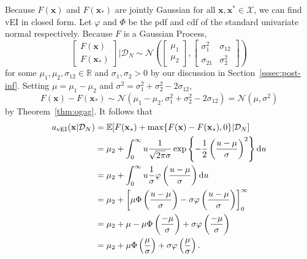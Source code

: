 Because $F(\mathbf{x})$ and $F(\mathbf{x}_*)$ are jointly Gaussian for all $\mathbf{x}, \mathbf{x}^{*} \in \mathcal{X}$, we can find vEI in closed form.
Let $\varphi$ and $\Phi$ be the pdf and cdf of the standard univariate normal respectively.
Because $F$ is a Gaussian Process,
\begin{equation*}
    \begin{bmatrix}
        F(\mathbf{x}) \\
        F(\mathbf{x}_*)
    \end{bmatrix}
    \bigg| \mathcal{D}_N
    \sim \mathcal{N}\left(
    \begin{bmatrix}
            \mu_1 \\
            \mu_2
        \end{bmatrix}
    ,
    \begin{bmatrix}
            \sigma_{1}^2 & \sigma_{12} \\
            \sigma_{21} & \sigma^2_2
        \end{bmatrix}
    \right)
\end{equation*}
for some $\mu_1, \mu_2, \sigma_{12} \in \mathbb{R}$ and $\sigma_1, \sigma_2 > 0$ by our discussion in Section~\ref{sssec:post-inf}.
Setting $\mu = \mu_1 - \mu_2$ and $\sigma^2 = \sigma_1^2 + \sigma_2^2 - 2 \sigma_{12}$,
\begin{equation*}
    F(\mathbf{x}) - F\left(\mathbf{x}_*\right) \sim \mathcal{N}(\mu_1 - \mu_2, \sigma_1^2 + \sigma_2^2 - 2\sigma_{12})
    = \mathcal{N}\left(\mu, \sigma^2\right)
\end{equation*}
by Theorem~\ref{thm:ogag}.
It follows that
\begin{align*}
    a_{\mathrm{vEI}}(\mathbf{x} | \mathcal{D}_N)
    & =  \mathbb{E}[F(\mathbf{x}_*) + \max \{  F(\mathbf{x}) - F(\mathbf{x}_*), 0 \} | \mathcal{D}_N] \\
    & = \mu_2 + \int_{0}^\infty u \frac{ 1 }{ \sqrt{2 \pi } \sigma} \exp \left\{ -\frac12 \left(\frac{ u - \mu }{ \sigma }\right)^2 \right\} \mathrm{d} u \\
    & = \mu_2 + \int_{0}^\infty u \frac{ 1 }{ \sigma } \varphi\left(\frac{ u - \mu }{ \sigma }\right) \mathrm{d} u \\
    & = \mu_2 + \left[ \mu \Phi\left(\frac{ u - \mu }{ \sigma }\right) - \sigma \varphi\left(\frac{ u - \mu }{ \sigma }\right)\right]_{0}^{\infty} \\
    & = \mu_2 +  \mu - \mu \Phi\left(\frac{ -\mu }{ \sigma }\right) + \sigma \varphi\left(\frac{ -\mu }{ \sigma }\right) \\
    & = \mu_2 + \mu \Phi\left(\frac{ \mu }{ \sigma }\right) + \sigma \varphi\left(\frac{ \mu }{ \sigma }\right).
\end{align*}
